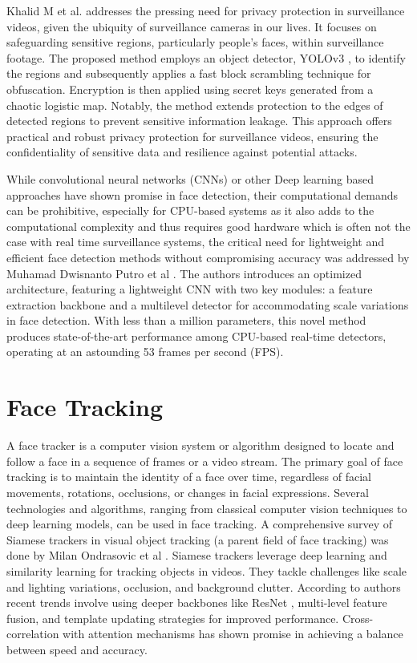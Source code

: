 Khalid M et al. \cite{hosny_privacy_2022} addresses the pressing need for privacy protection in surveillance videos, given the ubiquity of surveillance cameras in our lives. It focuses on safeguarding sensitive regions, particularly people's faces, within surveillance footage. The proposed method employs an object detector, YOLOv3 \cite{aziz_exploring_2020}, to identify the regions and subsequently applies a fast block scrambling technique for obfuscation. Encryption is then applied using secret keys generated from a chaotic logistic map. Notably, the method extends protection to the edges of detected regions to prevent sensitive information leakage. This approach offers practical and robust privacy protection for surveillance videos, ensuring the confidentiality of sensitive data and resilience against potential attacks.

While convolutional neural networks (CNNs) or other Deep learning based approaches have shown promise in face detection, their computational demands can be prohibitive, especially for CPU-based systems as it also adds to the computational complexity and thus requires good hardware which is often not the case with real time surveillance systems, the critical need for lightweight and efficient face detection methods without compromising accuracy was addressed by Muhamad Dwisnanto Putro et al \cite{putro_high_2021}. The authors introduces an optimized architecture, featuring a lightweight CNN with two key modules: a feature extraction backbone and a multilevel detector for accommodating scale variations in face detection. With less than a million parameters, this novel method produces state-of-the-art performance among CPU-based real-time detectors, operating at an astounding 53 frames per second (FPS).

\section{Face Tracking} \label{section:ft}
A face tracker is a computer vision system or algorithm designed to locate and follow a face in a sequence of frames or a video stream. The primary goal of face tracking is to maintain the identity of a face over time, regardless of facial movements, rotations, occlusions, or changes in facial expressions. Several technologies and algorithms, ranging from classical computer vision techniques to deep learning models, can be used in face tracking. A comprehensive survey of Siamese trackers in visual object tracking (a parent field of face tracking) was done by Milan Ondrasovic et al \cite{ondrasovic_siamese_2021}. Siamese trackers leverage deep learning and similarity learning for tracking objects in videos. They tackle challenges like scale and lighting variations, occlusion, and background clutter. According to authors recent trends involve using deeper backbones like ResNet \cite{aziz_exploring_2020}, multi-level feature fusion, and template updating strategies for improved performance. Cross-correlation with attention mechanisms has shown promise in achieving a balance between speed and accuracy.

